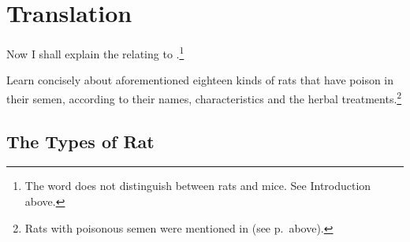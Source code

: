 \section{Translation}

\begin{translation}
    
    \item[1] 
    
Now I shall explain the  relating to 
.\footnote{The word  does not distinguish 
between rats and mice.  See Introduction above.}
    
    \item[3] 
    
    Learn concisely about aforementioned eighteen kinds of rats that have 
    poison in their semen, according to their names, characteristics and the 
    herbal treatments.\footnote{Rats with poisonous semen were mentioned 
    in  (see p.\,\pageref{sukravisa} above).}
    
\subsection{The Types of Rat}

    \item[4--6]
    

\end{translation}
